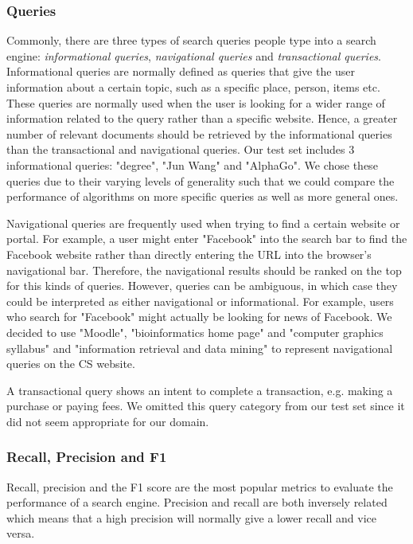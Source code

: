 \subsubsection{Queries}
\label{ssub:evaluation_queries}
Commonly, there are three types of search queries people type into a search engine: \emph{informational queries}, \emph{navigational queries} and \emph{transactional queries}.
Informational queries are normally defined as queries that give the user information about a certain topic, such as a specific place, person, items etc. These queries are normally used when the user is looking for a wider range of information related to the query rather than a specific website. Hence, a greater number of relevant documents should be retrieved by the informational queries than the transactional and navigational queries. Our test set includes 3 informational queries: "degree", "Jun Wang" and "AlphaGo". We chose these queries due to their varying levels of generality such that we could compare the performance of algorithms on more specific queries as well as more general ones.

Navigational queries are frequently used when trying to find a certain website or portal. For example, a user might enter "Facebook" into the search bar to find the Facebook website rather than directly entering the URL into the browser's navigational bar. Therefore, the navigational results should be ranked on the top for this kinds of queries. However, queries can be ambiguous, in which case they could be interpreted as either navigational or informational. For example, users who search for "Facebook" might actually be looking for news of Facebook. We decided to use "Moodle", "bioinformatics home page" and "computer graphics syllabus" and "information retrieval and data mining" to represent navigational queries on the CS website.

A transactional query shows an intent to complete a transaction, e.g. making a purchase or paying fees. We omitted this query category from our test set since it did not seem appropriate for our domain.

\subsubsection{Recall, Precision and F1}
Recall, precision and the F1 score are the most popular metrics to evaluate the performance of a search engine. Precision and recall are both inversely related which means that a high precision will normally give a lower recall and vice versa.

